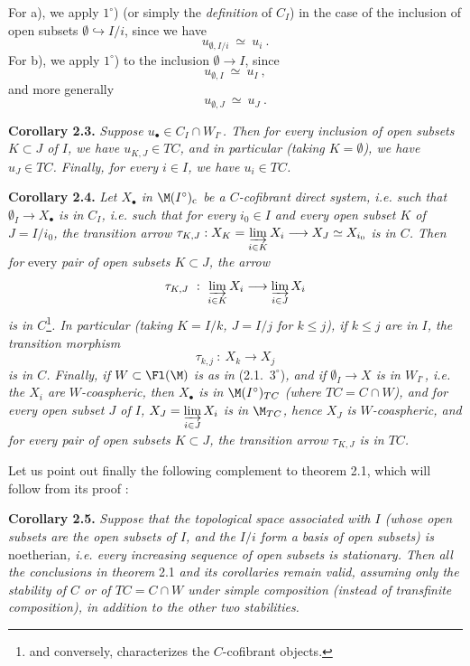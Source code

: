 

For a), we apply $1^\circ$) (or simply the \textit{definition} of $C_I$) in the case of the inclusion of open subsets $\emptyset \hookrightarrow I/i$, since we have
\[
u_{\emptyset,I/i} \ \simeq\ u_i \ .
\]
For b), we apply $1^\circ$) to the inclusion $\emptyset \longrightarrow I$, since
\[
u_{\emptyset,I} \ \simeq\ u_I \ ,
\]
and more generally
\[
u_{\emptyset,J} \ \simeq\ u_J \ .
\]

\textbf{Corollary 2.3.} \textit{Suppose $u_\bullet \in C_I \cap W_{I^\circ}$. Then for every inclusion of open subsets $K \subset J$ of $I$, we have $u_{K,J} \in TC$, and in particular (taking $K = \emptyset$), we have $u_J \in TC$. Finally, for every $i \in I$, we have $u_i \in TC$.}

\textbf{Corollary 2.4.} \textit{Let $X_\bullet$ in $\M(I^\circ)_{\mathrm{c}}$ be a $C$-cofibrant direct system, i.e. such that $\emptyset_I \longrightarrow X_\bullet$ is in $C_I$, i.e. such that for every $i_0 \in I$ and every open subset $K$ of $J = I/i_0$, the transition arrow $\tau_{K,J} : X_K = \varinjlim\limits_{i\in K} X_i \longrightarrow X_J \simeq X_{i_0}$ is in $C$. Then for} \textup{every} \textit{pair of open subsets $K \subset J$, the arrow}
\[
\tau_{K,J} \ :\ \varinjlim_{i\in K} X_i \longrightarrow \varinjlim_{i\in J} X_i
\]
\textit{is in $C$}\footnote[12]{and conversely, characterizes the $C$-cofibrant objects.}\textit{. In particular (taking $K = I/k$, $J = I/j$ for $k \leq j$), if $k \leq j$ are in $I$, the transition morphism}
\[
\tau_{k,j} \ :\ X_k \longrightarrow X_j
\]
\textit{is in $C$. Finally, if $W \subset \Fl(\M)$ is as in} \textup{(2.1.\ $3^\circ$)}\textit{, and if $\emptyset_I \longrightarrow X$ is in $W_{I^\circ}$, i.e. the $X_i$ are $W$-coaspheric, then $X_\bullet$ is in $\M(I^\circ)_{TC}$ (where $TC = C \cap W$), and for every open subset $J$ of $I$, $X_J = \varinjlim\limits_{i\in J} X_i$ is in $\M_{TC}$, hence $X_J$ is $W$-coaspheric, and for every pair of open subsets $K \subset J$, the transition arrow $\tau_{K,J}$ is in $TC$.}

Let us point out finally the following complement to theorem 2.1, which will follow from its proof :

\textbf{Corollary 2.5.} \textit{Suppose that the topological space associated with $I$ (whose open subsets are the open subsets of $I$, and the $I/i$ form a basis of open subsets) is} \textup{noetherian}\textit{, i.e. every increasing sequence of open subsets is stationary. Then all the conclusions in theorem} \textup{2.1} \textit{and its corollaries remain valid, assuming only the stability of $C$ or of $TC = C \cap W$ under simple composition (instead of transfinite composition), in addition to the other two stabilities.}

